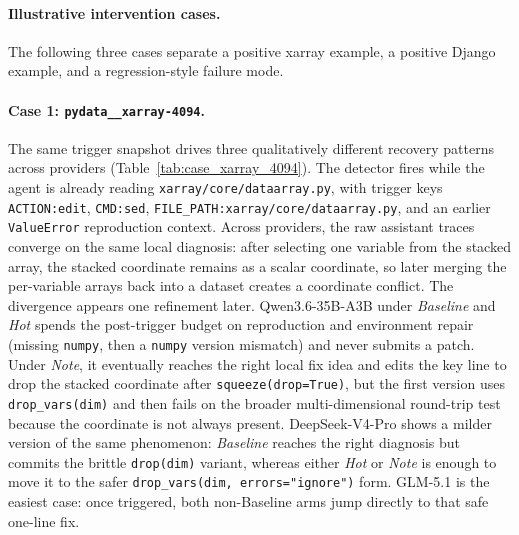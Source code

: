 \paragraph{Illustrative intervention cases.}
The following three cases separate a positive xarray example, a positive Django example, and a regression-style failure mode.

\paragraph{Case 1: \texttt{pydata\_\allowbreak{}\_xarray-4094}.}
The same trigger snapshot drives three qualitatively different recovery patterns across providers (Table~\ref{tab:case_xarray_4094}).
The detector fires while the agent is already reading \texttt{xarray/core/\allowbreak{}dataarray.py}, with trigger keys \texttt{ACTION:edit}, \texttt{CMD:sed}, \texttt{FILE\_PATH:xarray/core/\allowbreak{}dataarray.py}, and an earlier \texttt{ValueError} reproduction context.
Across providers, the raw assistant traces converge on the same local diagnosis: after selecting one variable from the stacked array, the stacked coordinate remains as a scalar coordinate, so later merging the per-variable arrays back into a dataset creates a coordinate conflict.
The divergence appears one refinement later.
Qwen3.6-35B-A3B under \emph{Baseline} and \emph{Hot} spends the post-trigger budget on reproduction and environment repair (missing \texttt{numpy}, then a \texttt{numpy} version mismatch) and never submits a patch.
Under \emph{Note}, it eventually reaches the right local fix idea and edits the key line to drop the stacked coordinate after \texttt{squeeze(drop=True)}, but the first version uses \texttt{drop\_vars(dim)} and then fails on the broader multi-dimensional round-trip test because the coordinate is not always present.
DeepSeek-V4-Pro shows a milder version of the same phenomenon: \emph{Baseline} reaches the right diagnosis but commits the brittle \texttt{drop(dim)} variant, whereas either \emph{Hot} or \emph{Note} is enough to move it to the safer \texttt{drop\_vars(dim,\allowbreak{} errors="ignore")} form.
GLM-5.1 is the easiest case: once triggered, both non-Baseline arms jump directly to that safe one-line fix.

